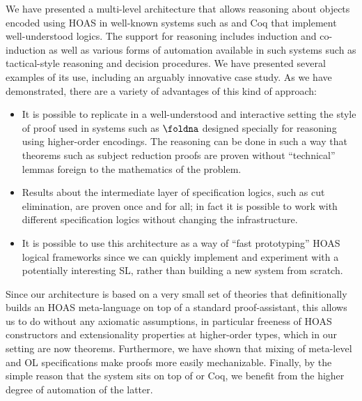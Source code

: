 \documentclass[final]{svjour3}
\begin{document}
We have presented a multi-level architecture that allows reasoning
about objects encoded using HOAS in well-known systems such as \HOL
and Coq that implement well-understood logics.  The support for
reasoning includes induction and co-induction as well as various forms
of automation available in such systems such as tactical-style
reasoning and decision procedures.  We have presented several examples
of its use, including an arguably innovative case study.  As we have
demonstrated, there are a variety of advantages of this kind of
approach:
\begin{itemize}
\item It is possible to replicate in a well-understood and interactive
  setting the style of proof used in systems such as $\foldna$
  designed specially for reasoning using higher-order encodings.  The
  reasoning can be done in such a way that theorems such as subject
  reduction proofs are proven without ``technical'' lemmas foreign to
  the mathematics of the problem.
\item Results about the intermediate layer of specification logics,
  such as cut elimination, are proven once and for all; in fact it is
  possible to work with different specification logics without
  changing the infrastructure.
\item It is possible to use this architecture as a way of ``fast
  prototyping'' HOAS logical frameworks since we can quickly implement
  and experiment with a potentially interesting SL, rather than
  building a new system from scratch.
\end{itemize}

Since our architecture is based on a very small set of theories that
definitionally builds an HOAS meta-language on top of a standard
proof-assistant, this allows us to do without any axiomatic
assumptions, in particular freeness of HOAS constructors and
extensionality properties at higher-order types, which in our setting are
now theorems.  Furthermore, we have shown that mixing of meta-level
and OL specifications make proofs more easily mechanizable.  Finally,
by the simple reason that the \hybrid system sits on top of \HOL or
Coq, we benefit from the higher degree of automation of the latter.



\smallskip
\end{document}
